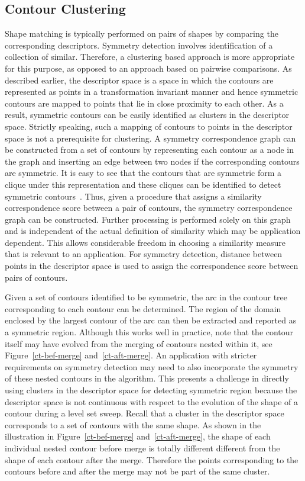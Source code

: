 \documentclass[review,journal]{vgtc}         %
\begin{document}
\subsection{Contour Clustering}
Shape matching is typically performed on pairs of shapes by comparing the corresponding descriptors. 
Symmetry detection involves identification of a collection of similar. Therefore, 
a clustering based approach is more appropriate for this purpose, 
as opposed to an approach based on pairwise comparisons.
As described earlier, the descriptor space is a space in which the contours are represented as 
points in a transformation invariant manner and hence symmetric contours are mapped to points 
that lie in close proximity to each other. As a result, symmetric contours can be easily 
identified as clusters in the descriptor space. Strictly speaking, such a mapping of contours to points in the
descriptor space is not a prerequisite for clustering. A symmetry correspondence
graph can be constructed from a set of contours by representing each contour
as a node in the graph and inserting an edge between two nodes if the corresponding
contours are symmetric. It is easy to see that the contours that are symmetric form
a clique under this representation and these cliques can be identified to detect
symmetric contours~\cite{Lip10}. Thus, given a procedure that assigns a similarity 
correspondence score between a pair of contours, the symmetry correspondence graph
can be constructed. Further processing is performed solely on this graph and is independent
of the actual definition of similarity which may be application dependent. This allows
considerable freedom in choosing a similarity measure that is relevant to an application.
For symmetry detection, distance between points in the descriptor space is 
used to assign the correspondence score between pairs of contours. 

Given a set of contours identified to be symmetric, the arc in the contour tree 
corresponding to each contour can be determined. The region of the domain
enclosed by the largest contour of the arc can then be extracted and reported
as a symmetric region. Although this works well in practice, note that the contour
itself may have evolved from the merging of contours nested within it, see Figure~\ref{ct-bef-merge}
and~\ref{ct-aft-merge}.
An application with stricter requirements on symmetry detection may need to
also incorporate the symmetry of these nested contours in the algorithm. 
This presents a challenge in directly using clusters in the descriptor space 
for detecting symmetric region because the descriptor space is not continuous with 
respect to the evolution of the shape of a contour during a level set sweep. 
Recall that a cluster in the descriptor space corresponds to a
set of contours with the same shape. As shown in the illustration in 
Figure~\ref{ct-bef-merge} and~\ref{ct-aft-merge}, the shape of each individual nested contour
before merge is totally different different from the shape of each contour after the merge.
Therefore the points corresponding to the contours before and after the merge may not be
part of the same cluster. 
\begin{figure}[h]
\scalebox{.2}{}
\end{figure}
\end{document}

